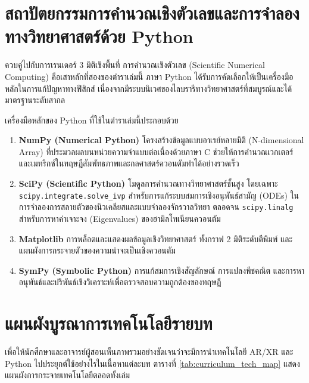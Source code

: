 \section*{สถาปัตยกรรมการคำนวณเชิงตัวเลขและการจำลองทางวิทยาศาสตร์ด้วย Python}

ควบคู่ไปกับการเรนเดอร์ 3 มิติเชิงพื้นที่ การคำนวณเชิงตัวเลข (Scientific Numerical Computing) คือเสาหลักที่สองของตำราเล่มนี้ ภาษา Python ได้รับการคัดเลือกให้เป็นเครื่องมือหลักในการแก้ปัญหาทางฟิสิกส์ เนื่องจากมีระบบนิเวศของไลบรารีทางวิทยาศาสตร์ที่สมบูรณ์และได้มาตรฐานระดับสากล

เครื่องมือหลักของ Python ที่ใช้ในตำราเล่มนี้ประกอบด้วย
\begin{enumerate}
    \item \textbf{NumPy (Numerical Python)} โครงสร้างข้อมูลแบบอาเรย์หลายมิติ (N-dimensional Array) ที่ประมวลผลบนหน่วยความจำแบบต่อเนื่องด้วยภาษา C ช่วยให้การคำนวณเวกเตอร์และเมทริกซ์ในทฤษฎีสัมพัทธภาพและกลศาสตร์ควอนตัมทำได้อย่างรวดเร็ว
    \item \textbf{SciPy (Scientific Python)} โมดูลการคำนวณทางวิทยาศาสตร์ชั้นสูง โดยเฉพาะ \texttt{scipy.integrate.solve\_ivp} สำหรับการแก้ระบบสมการเชิงอนุพันธ์สามัญ (ODEs) ในการจำลองการสลายตัวของนิวเคลียสและแบบจำลองจักรวาลวิทยา ตลอดจน \texttt{scipy.linalg} สำหรับการหาค่าเจาะจง (Eigenvalues) ของฮามิลโทเนียนควอนตัม
    \item \textbf{Matplotlib} การพล็อตและแสดงผลข้อมูลเชิงวิทยาศาสตร์ ทั้งกราฟ 2 มิติระดับตีพิมพ์ และแผนผังการกระจายตัวของความน่าจะเป็นเชิงควอนตัม
    \item \textbf{SymPy (Symbolic Python)} การแก้สมการเชิงสัญลักษณ์ การแปลงพีชคณิต และการหาอนุพันธ์และปริพันธ์เชิงวิเคราะห์เพื่อตรวจสอบความถูกต้องของทฤษฎี
\end{enumerate}

\section*{แผนผังบูรณาการเทคโนโลยีรายบท}

เพื่อให้นักศึกษาและอาจารย์ผู้สอนเห็นภาพรวมอย่างชัดเจนว่าจะมีการนำเทคโนโลยี AR/XR และ Python ไปประยุกต์ใช้อย่างไรในเนื้อหาแต่ละบท ตารางที่ \ref{tab:curriculum_tech_map} แสดงแผนผังการกระจายเทคโนโลยีตลอดทั้งเล่ม

